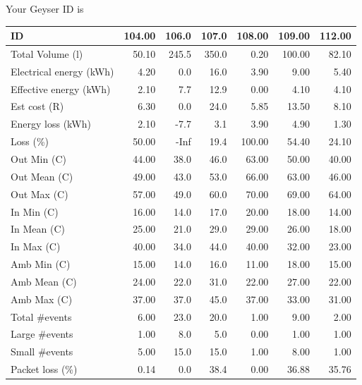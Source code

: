 \documentclass{article}\usepackage[]{graphicx}\usepackage[]{color}
\newenvironment{knitrout}{}{} %
\begin{document}
Your Geyser ID is  \\
\begin{center}


\begin{knitrout}
\color{fgcolor}
\begin{tabular}{l|r|r|r|r|r|r}
\hline
ID & 104.00 & 106.0 & 107.0 & 108.00 & 109.00 & 112.00\\
\hline
Total Volume (l) & 50.10 & 245.5 & 350.0 & 0.20 & 100.00 & 82.10\\
\hline
Electrical energy (kWh) & 4.20 & 0.0 & 16.0 & 3.90 & 9.00 & 5.40\\
\hline
Effective energy (kWh) & 2.10 & 7.7 & 12.9 & 0.00 & 4.10 & 4.10\\
\hline
Est cost (R) & 6.30 & 0.0 & 24.0 & 5.85 & 13.50 & 8.10\\
\hline
Energy loss (kWh) & 2.10 & -7.7 & 3.1 & 3.90 & 4.90 & 1.30\\
\hline
Loss (\%) & 50.00 & -Inf & 19.4 & 100.00 & 54.40 & 24.10\\
\hline
Out Min (C) & 44.00 & 38.0 & 46.0 & 63.00 & 50.00 & 40.00\\
\hline
Out Mean (C) & 49.00 & 43.0 & 53.0 & 66.00 & 63.00 & 46.00\\
\hline
Out Max (C) & 57.00 & 49.0 & 60.0 & 70.00 & 69.00 & 64.00\\
\hline
In Min (C) & 16.00 & 14.0 & 17.0 & 20.00 & 18.00 & 14.00\\
\hline
In Mean (C) & 25.00 & 21.0 & 29.0 & 29.00 & 26.00 & 18.00\\
\hline
In Max (C) & 40.00 & 34.0 & 44.0 & 40.00 & 32.00 & 23.00\\
\hline
Amb Min (C) & 15.00 & 14.0 & 16.0 & 11.00 & 18.00 & 15.00\\
\hline
Amb Mean (C) & 24.00 & 22.0 & 31.0 & 22.00 & 27.00 & 22.00\\
\hline
Amb Max (C) & 37.00 & 37.0 & 45.0 & 37.00 & 33.00 & 31.00\\
\hline
Total \#events & 6.00 & 23.0 & 20.0 & 1.00 & 9.00 & 2.00\\
\hline
Large \#events & 1.00 & 8.0 & 5.0 & 0.00 & 1.00 & 1.00\\
\hline
Small \#events & 5.00 & 15.0 & 15.0 & 1.00 & 8.00 & 1.00\\
\hline
Packet loss (\%) & 0.14 & 0.0 & 38.4 & 0.00 & 36.88 & 35.76\\
\hline
\end{tabular}


\end{knitrout}
\end{center}
\end{document}
